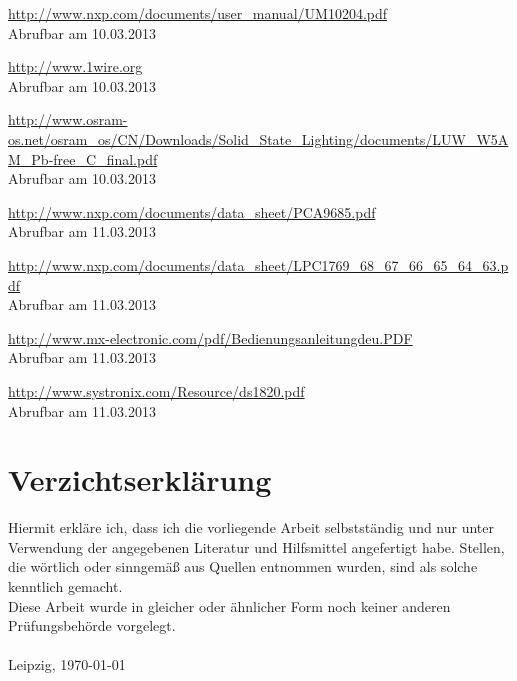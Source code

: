 \documentclass[a4paper,12pt]{scrartcl}
\begin{document}
\renewcommand\refname{Quellenverzeichnis}
\begin{thebibliography}{999}

\url{http://www.nxp.com/documents/user_manual/UM10204.pdf}
\\Abrufbar am 10.03.2013

\url{http://www.1wire.org}
\\Abrufbar am 10.03.2013

\url{http://www.osram-os.net/osram_os/CN/Downloads/Solid_State_Lighting/documents/LUW_W5AM_Pb-free_C_final.pdf}
\\Abrufbar am 10.03.2013

\url{http://www.nxp.com/documents/data_sheet/PCA9685.pdf}
\\Abrufbar am 11.03.2013

\url{http://www.nxp.com/documents/data_sheet/LPC1769_68_67_66_65_64_63.pdf}
\\Abrufbar am 11.03.2013

\url{http://www.mx-electronic.com/pdf/Bedienungsanleitungdeu.PDF}
\\Abrufbar am 11.03.2013

\url{http://www.systronix.com/Resource/ds1820.pdf}
\\Abrufbar am 11.03.2013

\end{thebibliography}

\clearpage
\section{Verzichtserkl\"arung}
\thispagestyle{plain}

Hiermit erkläre ich, dass ich die vorliegende Arbeit selbstständig und nur unter Verwendung der angegebenen Literatur und Hilfsmittel angefertigt habe.
Stellen, die wörtlich oder sinngemäß aus Quellen entnommen wurden, sind als solche
kenntlich gemacht.\\

Diese Arbeit wurde in gleicher oder ähnlicher Form noch keiner anderen Prüfungsbehörde vorgelegt.\\\\

Leipzig, \today
\end{document}
